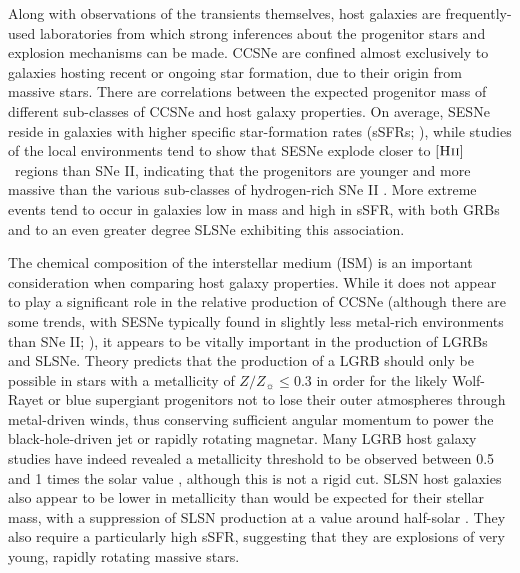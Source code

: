 \documentclass[fleqn,usenatbib,]{mnras}
\newcommand{\HII}[0]{$[\textnormal{\textsc{Hii}}]$}
\begin{document}
 Along with observations of the transients themselves, host galaxies are frequently-used laboratories from which strong inferences about the progenitor stars and explosion mechanisms can be made. CCSNe are confined almost exclusively to galaxies hosting recent or ongoing star formation, due to their origin from massive stars. There are correlations between the expected progenitor mass of different sub-classes of CCSNe and host galaxy properties. On average, SESNe reside in galaxies with higher specific star-formation rates (sSFRs; \citealt{James2006,Kelly2008}), while studies of the local environments tend to show that SESNe explode closer to \HII~regions than SNe II, indicating that the progenitors are younger and more massive than the various sub-classes of hydrogen-rich SNe II  \citep[e.g.][]{Anderson2012,Galbany2018}. More extreme events tend to occur in galaxies low in mass and high in sSFR, with both GRBs \citep[e.g.][]{Fruchter2006,LeFloch2006,Levesque2010,Kruehler2015,Vergani2015,Perley2016b,Palmerio2019,Taggart2019} and to an even greater degree SLSNe \citep[e.g.][]{Neill2011,Lunnan2014,Leloudas2015,Angus2016,Schulze2018,Taggart2019} exhibiting this association.
 
 The chemical composition of the interstellar medium (ISM) is an important consideration when comparing host galaxy properties. While it does not appear to play a significant role in the relative production of CCSNe (although there are some trends, with SESNe typically found in slightly less metal-rich environments than SNe II; \citealt{Galbany2018}), it appears to be vitally important in the production of LGRBs and SLSNe. Theory predicts that the production of a LGRB should only be possible in stars with a metallicity of $Z/Z_{\sun}\leq 0.3$ \citep{Woosley1993}  in order for the likely Wolf-Rayet or blue supergiant progenitors not to lose their outer atmospheres through metal-driven winds, thus conserving sufficient angular momentum to power the black-hole-driven jet or rapidly rotating magnetar. Many LGRB host galaxy studies have indeed revealed a metallicity threshold to be observed between 0.5 and 1 times the solar value \citep[e.g.][]{Stanek2006,Modjaz2008,Kruehler2015,Perley2016b,Japelj2016,Vergani2017}, although this is not a rigid cut.  
SLSN host galaxies also appear to be lower in metallicity than would be expected for their stellar mass, with a suppression of SLSN production at a value around half-solar \citep{Lunnan2014,Chen2016a,Perley2016c}. They also require a particularly high sSFR, suggesting that they are explosions of very young, rapidly rotating massive stars.
 
\end{document}
